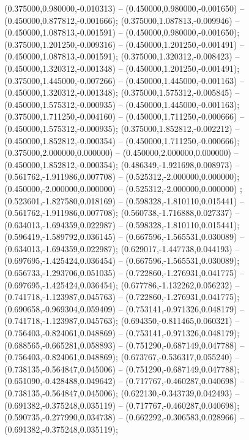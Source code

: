  (0.375000,0.980000,-0.010313) -- (0.450000,0.980000,-0.001650) -- (0.450000,0.877812,-0.001666);
 (0.375000,1.087813,-0.009946) -- (0.450000,1.087813,-0.001591) -- (0.450000,0.980000,-0.001650);
 (0.375000,1.201250,-0.009316) -- (0.450000,1.201250,-0.001491) -- (0.450000,1.087813,-0.001591);
 (0.375000,1.320312,-0.008423) -- (0.450000,1.320312,-0.001348) -- (0.450000,1.201250,-0.001491);
 (0.375000,1.445000,-0.007266) -- (0.450000,1.445000,-0.001163) -- (0.450000,1.320312,-0.001348);
 (0.375000,1.575312,-0.005845) -- (0.450000,1.575312,-0.000935) -- (0.450000,1.445000,-0.001163);
 (0.375000,1.711250,-0.004160) -- (0.450000,1.711250,-0.000666) -- (0.450000,1.575312,-0.000935);
 (0.375000,1.852812,-0.002212) -- (0.450000,1.852812,-0.000354) -- (0.450000,1.711250,-0.000666);
 (0.375000,2.000000,0.000000) -- (0.450000,2.000000,0.000000) -- (0.450000,1.852812,-0.000354);
 (0.486349,-1.921698,0.008973) -- (0.561762,-1.911986,0.007708) -- (0.525312,-2.000000,0.000000);
 (0.450000,-2.000000,0.000000) -- (0.525312,-2.000000,0.000000) ;
 (0.523601,-1.827580,0.018169) -- (0.598328,-1.810110,0.015441) -- (0.561762,-1.911986,0.007708);
 (0.560738,-1.716888,0.027337) -- (0.634013,-1.694359,0.022987) -- (0.598328,-1.810110,0.015441);
 (0.596419,-1.589792,0.036145) -- (0.667596,-1.565531,0.030089) -- (0.634013,-1.694359,0.022987);
 (0.629017,-1.447738,0.044193) -- (0.697695,-1.425424,0.036454) -- (0.667596,-1.565531,0.030089);
 (0.656733,-1.293706,0.051035) -- (0.722860,-1.276931,0.041775) -- (0.697695,-1.425424,0.036454);
 (0.677786,-1.132262,0.056232) -- (0.741718,-1.123987,0.045763) -- (0.722860,-1.276931,0.041775);
 (0.690658,-0.969304,0.059409) -- (0.753141,-0.971326,0.048179) -- (0.741718,-1.123987,0.045763);
 (0.694350,-0.811465,0.060321) -- (0.756403,-0.824061,0.048869) -- (0.753141,-0.971326,0.048179);
 (0.688565,-0.665281,0.058893) -- (0.751290,-0.687149,0.047788) -- (0.756403,-0.824061,0.048869);
 (0.673767,-0.536317,0.055240) -- (0.738135,-0.564847,0.045006) -- (0.751290,-0.687149,0.047788);
 (0.651090,-0.428488,0.049642) -- (0.717767,-0.460287,0.040698) -- (0.738135,-0.564847,0.045006);
 (0.622130,-0.343739,0.042493) -- (0.691382,-0.375248,0.035119) -- (0.717767,-0.460287,0.040698);
 (0.590735,-0.277990,0.034738) -- (0.662292,-0.306583,0.028966) -- (0.691382,-0.375248,0.035119);
